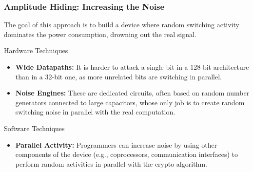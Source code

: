 \begin{frame}
    \frametitle{Amplitude Hiding: Increasing the Noise}

    The goal of this approach is to build a device where random switching activity dominates the power consumption, drowning out the real signal.

    \begin{block}{Hardware Techniques}
        \begin{itemize}
            \item \textbf{Wide Datapaths:} It is harder to attack a single bit in a 128-bit architecture than in a 32-bit one, as more unrelated bits are switching in parallel.
            
            \item \textbf{Noise Engines:} These are dedicated circuits, often based on random number generators connected to large capacitors, whose only job is to create random switching noise in parallel with the real computation.
        \end{itemize}
    \end{block}
    
    \begin{block}{Software Techniques}
        \begin{itemize}
            \item \textbf{Parallel Activity:} Programmers can increase noise by using other components of the device (e.g., coprocessors, communication interfaces) to perform random activities in parallel with the crypto algorithm.
        \end{itemize}
    \end{block}

\end{frame}

